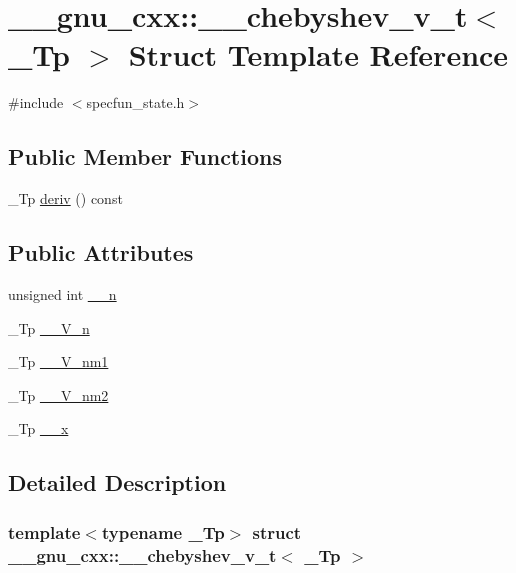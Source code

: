 \hypertarget{struct____gnu__cxx_1_1____chebyshev__v__t}{}\section{\+\_\+\+\_\+gnu\+\_\+cxx\+:\+:\+\_\+\+\_\+chebyshev\+\_\+v\+\_\+t$<$ \+\_\+\+Tp $>$ Struct Template Reference}
\label{struct____gnu__cxx_1_1____chebyshev__v__t}


{\ttfamily \#include $<$specfun\+\_\+state.\+h$>$}

\subsection*{Public Member Functions}
\begin{DoxyCompactItemize}
\item 
\+\_\+\+Tp \hyperlink{struct____gnu__cxx_1_1____chebyshev__v__t_a3ac7c3f4a04b5ec272f73c5dde89f218}{deriv} () const
\end{DoxyCompactItemize}
\subsection*{Public Attributes}
\begin{DoxyCompactItemize}
\item 
unsigned int \hyperlink{struct____gnu__cxx_1_1____chebyshev__v__t_a8981f11be84a3bc3b8a1bc7991cd75e2}{\+\_\+\+\_\+n}
\item 
\+\_\+\+Tp \hyperlink{struct____gnu__cxx_1_1____chebyshev__v__t_abb11b27e13fa8be8d19f9eb10e851e4e}{\+\_\+\+\_\+\+V\+\_\+n}
\item 
\+\_\+\+Tp \hyperlink{struct____gnu__cxx_1_1____chebyshev__v__t_af6a7e1e151961b9d214e84192683ddc9}{\+\_\+\+\_\+\+V\+\_\+nm1}
\item 
\+\_\+\+Tp \hyperlink{struct____gnu__cxx_1_1____chebyshev__v__t_a575f76c4163fdd8fe7cf3605c6921bfd}{\+\_\+\+\_\+\+V\+\_\+nm2}
\item 
\+\_\+\+Tp \hyperlink{struct____gnu__cxx_1_1____chebyshev__v__t_a58e22482d8e79ded483fa4816e959a5c}{\+\_\+\+\_\+x}
\end{DoxyCompactItemize}


\subsection{Detailed Description}
\subsubsection*{template$<$typename \+\_\+\+Tp$>$\newline
struct \+\_\+\+\_\+gnu\+\_\+cxx\+::\+\_\+\+\_\+chebyshev\+\_\+v\+\_\+t$<$ \+\_\+\+Tp $>$}


